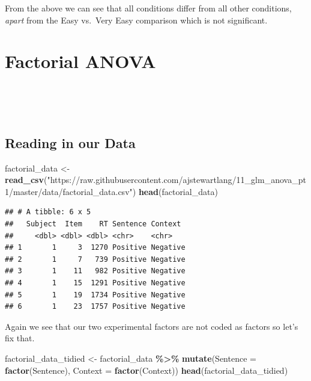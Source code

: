 \documentclass[
]{book}
\newenvironment{Shaded}{\begin{snugshade}}{\end{snugshade}}
\newcommand{\AttributeTok}[1]{\textcolor[rgb]{0.13,0.29,0.53}{#1}}
\newcommand{\FunctionTok}[1]{\textcolor[rgb]{0.13,0.29,0.53}{\textbf{#1}}}
\newcommand{\NormalTok}[1]{#1}
\newcommand{\OtherTok}[1]{\textcolor[rgb]{0.56,0.35,0.01}{#1}}
\newcommand{\SpecialCharTok}[1]{\textcolor[rgb]{0.81,0.36,0.00}{\textbf{#1}}}
\newcommand{\StringTok}[1]{\textcolor[rgb]{0.31,0.60,0.02}{#1}}
\begin{document}
From the above we can see that all conditions differ from all other conditions, \emph{apart} from the Easy vs.~Very Easy comparison which is not significant.

\hypertarget{factorial-anova}{%
\section{Factorial ANOVA}\label{factorial-anova}}

~~

~~

\hypertarget{reading-in-our-data-2}{%
\subsection{Reading in our Data}\label{reading-in-our-data-2}}

\begin{Shaded}
\begin{Highlighting}[]
\NormalTok{factorial\_data }\OtherTok{\textless{}{-}} \FunctionTok{read\_csv}\NormalTok{(}\StringTok{"https://raw.githubusercontent.com/ajstewartlang/11\_glm\_anova\_pt1/master/data/factorial\_data.csv"}\NormalTok{)}
\FunctionTok{head}\NormalTok{(factorial\_data)}
\end{Highlighting}
\end{Shaded}

\begin{verbatim}
## # A tibble: 6 x 5
##   Subject  Item    RT Sentence Context 
##     <dbl> <dbl> <dbl> <chr>    <chr>   
## 1       1     3  1270 Positive Negative
## 2       1     7   739 Positive Negative
## 3       1    11   982 Positive Negative
## 4       1    15  1291 Positive Negative
## 5       1    19  1734 Positive Negative
## 6       1    23  1757 Positive Negative
\end{verbatim}

Again we see that our two experimental factors are not coded as factors so let's fix that.

\begin{Shaded}
\begin{Highlighting}[]
\NormalTok{factorial\_data\_tidied }\OtherTok{\textless{}{-}}\NormalTok{ factorial\_data }\SpecialCharTok{\%\textgreater{}\%}
  \FunctionTok{mutate}\NormalTok{(}\AttributeTok{Sentence =} \FunctionTok{factor}\NormalTok{(Sentence), }\AttributeTok{Context =} \FunctionTok{factor}\NormalTok{(Context))}
\FunctionTok{head}\NormalTok{(factorial\_data\_tidied)}
\end{Highlighting}
\end{Shaded}
\end{document}
